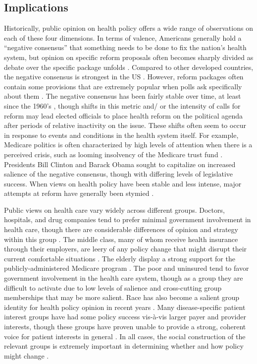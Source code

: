 \subsection*{Implications}
Historically, public opinion on health policy offers a wide range of observations on each of these four dimensions. In terms of valence, Americans generally hold a ``negative consensus'' that something needs to be done to fix the nation's health system, but opinion on specific reform proposals often becomes sharply divided as debate over the specific package unfolds \citep{Starr1982,Starr2011,Skocpol1996,Marmor1994}. Compared to other developed countries, the negative consensus is strongest in the US \citep{Blendon1990}. However, reform packages often contain some provisions that are extremely popular when polls ask specifically about them \citep{Skocpol1996,Brodie2010,Grande2011}. The negative consensus has been fairly stable over time, at least since the 1960's \citep{Starr1982,Starr2011,Jacobs2008}, though shifts in this metric and/ or the intensity of calls for reform may lead elected officials to place health reform on the political agenda after periods of relative inactivity on the issue. These shifts often seem to occur in response to events and conditions in the health system itself. For example, Medicare politics is often characterized by high levels of attention when there is a perceived crisis, such as looming insolvency of the Medicare trust fund \citep{Oberlander2003}. Presidents Bill Clinton \citep{Skocpol1996} and Barack Obama \citep{Starr2011,Jacobs2008} sought to capitalize on increased salience of the negative consensus, though with differing levels of legislative success. When views on health policy have been stable and less intense, major attempts at reform have generally been stymied \citep{Starr1982}.

Public views on health care vary widely across different groups. Doctors, hospitals, and drug companies tend to prefer minimal government involvement in health care, though there are considerable differences of opinion and strategy within this group \citep{Starr1982}. The middle class, many of whom receive health insurance through their employers, are leery of any policy change that might disrupt their current comfortable situations \citep{Skocpol1996}. The elderly display a strong support for the publicly-administered Medicare program \citep{Oberlander2003}. The poor and uninsured tend to favor government involvement in the health care system, though as a group they are difficult to activate due to low levels of salience and cross-cutting group memberships that may be more salient. Race has also become a salient group identity for health policy opinion in recent years \citep{Tesler2012,Henderson2011}. Many disease-specific patient interest groups have had some policy success vis-\`{a}-vis larger payer and provider interests, though these groups have proven unable to provide a strong, coherent voice for patient interests in general \citep{Keller2014}. In all cases, the social construction of the relevant groups is extremely important in determining whether and how policy might change \citep{Schneider1993}.

